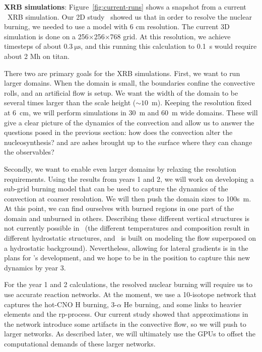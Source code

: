 {\bf XRB simulations}:  Figure~\ref{fig:current-runs} shows
a snapshot from a current \maestro\ XRB simulation.
Our
2D study~\cite{XRB2} showed us that in order to resolve the 
nuclear burning, we needed to use a model with 6 cm resolution.
The current 3D simulation is done on a 256$\times$256$\times$768
grid.  At this resolution, we achieve timesteps of about $0.3~\mathrm{\mu s}$,
and this running this calculation to 0.1~s would require about 2 Mh on titan.

There two are primary goals for the XRB simulations.  First, we want to run
larger domains.  When the domain is small, the boundaries confine the convective
rolls, and an artificial flow is setup.  We want the width of the domain to be
several times larger than the scale height ($\sim 10$~m).  Keeping the
resolution fixed at 6~cm, we will perform simulations in 30~m and 60~m wide
domains.  These will give a clear picture of the dynamics of the convection
and allow us to answer the questions posed in the previous section:
how does the convection alter the nucleosynthesis? and are ashes brought
up to the surface where they can change the observables?

Secondly, we want to enable even larger domains by relaxing the
resolution requirements.  Using the results from years 1 and 2, we
will work on developing a sub-grid burning model that can be used to
capture the dynamics of the convection at coarser resolution.  We will
then push the domain sizes to 100s~m.  At this point, we can find ourselves
with burned regions in one part of the domain and unburned in others.  
Describing these different vertical structures is not currently possible
in \maestro\ (the different temperatures and composition result in different
hydrostatic structures, and \maestro\ is built on modeling the flow superposed
on a hydrostatic background).  Nevertheless, allowing for lateral gradients is 
in the plans for \maestro's development, and we hope to be in the position
to capture this new dynamics by year 3.

For the year 1 and 2 calculations, the resolved nuclear burning will require
us to use accurate reaction networks.  At the moment, we use a 10-isotope
network that captures the hot-CNO H burning, 3-$\alpha$ He burning, and some
links to heavier elements and the rp-process.  Our current study showed that
approximations in the network introduce some artifacts in the convective flow,
so we will push to larger networks.  As described later, we will ultimately
use the GPUs to offset the computational demands of these larger networks.


